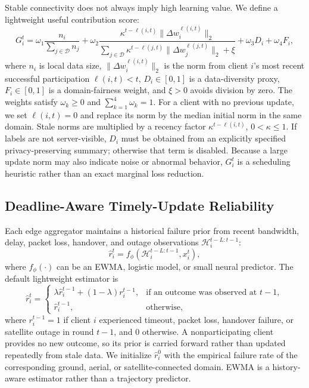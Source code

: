 \documentclass[preprint,12pt]{elsarticle}
\begin{document}
Stable connectivity does not always imply high learning value. We define a lightweight useful contribution score:
\begin{equation}
	G_i^t =
	\omega_1
	\frac{n_i}{\sum_{j \in \mathcal{D}} n_j}
	+
	\omega_2
	\frac{\kappa^{t-\ell(i,t)}\|\Delta w_i^{\ell(i,t)}\|_2}
	{\sum_{j \in \mathcal{D}}\kappa^{t-\ell(j,t)}\|\Delta w_j^{\ell(j,t)}\|_2 + \xi}
	+
	\omega_3 D_i
	+
	\omega_4 F_i,
	\label{eq:contribution}
\end{equation}
where $n_i$ is local data size, $\|\Delta w_i^{\ell(i,t)}\|_2$ is the norm from client $i$'s most recent successful participation $\ell(i,t)<t$, $D_i\in[0,1]$ is a data-diversity proxy, $F_i\in[0,1]$ is a domain-fairness weight, and $\xi>0$ avoids division by zero. The weights satisfy $\omega_k\geq0$ and $\sum_{k=1}^4\omega_k=1$. For a client with no previous update, we set $\ell(i,t)=0$ and replace its norm by the median initial norm in the same domain. Stale norms are multiplied by a recency factor $\kappa^{t-\ell(i,t)}$, $0<\kappa\leq1$. If labels are not server-visible, $D_i$ must be obtained from an explicitly specified privacy-preserving summary; otherwise that term is disabled. Because a large update norm may also indicate noise or abnormal behavior, $G_i^t$ is a scheduling heuristic rather than an exact marginal loss reduction.

\subsection{Deadline-Aware Timely-Update Reliability}

Each edge aggregator maintains a historical failure prior from recent bandwidth, delay, packet loss, handover, and outage observations $\mathcal{H}_i^{t-L:t-1}$:
\begin{equation}
	\hat{r}_i^t = f_{\phi}\left(\mathcal{H}_i^{t-L:t-1}, x_i^t\right),
\end{equation}
where $f_{\phi}(\cdot)$ can be an EWMA, logistic model, or small neural predictor. The default lightweight estimator is
\begin{equation}
	\hat{r}_i^t =
	\begin{cases}
	\lambda \hat{r}_i^{t-1}+(1-\lambda)r_i^{t-1},
	& \text{if an outcome was observed at }t-1,\\
	\hat{r}_i^{t-1}, & \text{otherwise},
	\end{cases}
	\label{eq:ewma}
\end{equation}
where $r_i^{t-1}=1$ if client $i$ experienced timeout, packet loss, handover failure, or satellite outage in round $t-1$, and $0$ otherwise. A nonparticipating client provides no new outcome, so its prior is carried forward rather than updated repeatedly from stale data. We initialize $\hat r_i^0$ with the empirical failure rate of the corresponding ground, aerial, or satellite-connected domain. EWMA is a history-aware estimator rather than a trajectory predictor.
\end{document}
